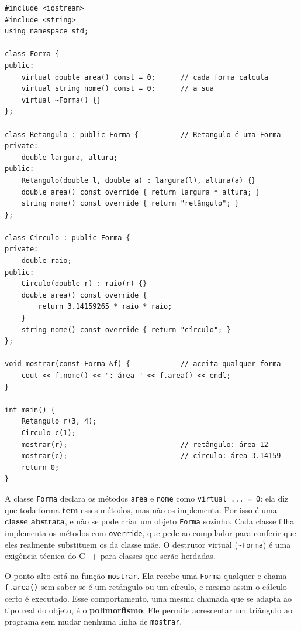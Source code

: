 \begin{codigo}
\begin{Verbatim}[breaklines=true, breaksymbolleft={}, fontsize=\footnotesize]
#include <iostream>
#include <string>
using namespace std;

class Forma {
public:
    virtual double area() const = 0;      // cada forma calcula
    virtual string nome() const = 0;      // a sua
    virtual ~Forma() {}
};

class Retangulo : public Forma {          // Retangulo é uma Forma
private:
    double largura, altura;
public:
    Retangulo(double l, double a) : largura(l), altura(a) {}
    double area() const override { return largura * altura; }
    string nome() const override { return "retângulo"; }
};

class Circulo : public Forma {
private:
    double raio;
public:
    Circulo(double r) : raio(r) {}
    double area() const override {
        return 3.14159265 * raio * raio;
    }
    string nome() const override { return "círculo"; }
};

void mostrar(const Forma &f) {            // aceita qualquer forma
    cout << f.nome() << ": área " << f.area() << endl;
}

int main() {
    Retangulo r(3, 4);
    Circulo c(1);
    mostrar(r);                           // retângulo: área 12
    mostrar(c);                           // círculo: área 3.14159
    return 0;
}
\end{Verbatim}
\end{codigo}

A classe \texttt{Forma} declara os métodos \texttt{area} e \texttt{nome} como \texttt{virtual ... = 0}: ela diz que toda forma \textbf{tem} esses métodos, mas não os implementa. Por isso é uma \textbf{classe abstrata}, e não se pode criar um objeto \texttt{Forma} sozinho. Cada classe filha implementa os métodos com \texttt{override}, que pede ao compilador para conferir que eles realmente substituem os da classe mãe. O destrutor virtual (\texttt{\textasciitilde Forma}) é uma exigência técnica do C++ para classes que serão herdadas.

O ponto alto está na função \texttt{mostrar}. Ela recebe uma \texttt{Forma} qualquer e chama \texttt{f.area()} sem saber se é um retângulo ou um círculo, e mesmo assim o cálculo certo é executado. Esse comportamento, uma mesma chamada que se adapta ao tipo real do objeto, é o \textbf{polimorfismo}. Ele permite acrescentar um triângulo ao programa sem mudar nenhuma linha de \texttt{mostrar}.

